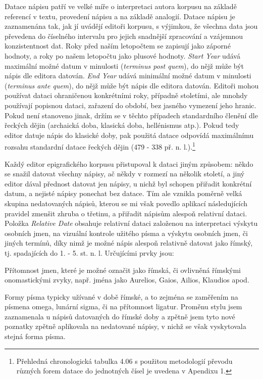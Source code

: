 Datace nápisu patří ve velké míře o interpretaci autora korpusu na základě referencí v textu, provedení nápisu a na základě analogií. Datace nápisu je zaznamenána tak, jak jí uvádějí editoři korpusu, s výjimkou, že všechna data jsou převedena do číselného intervalu pro jejich snadnější zpracování a vzájemnou konzistentnost dat. Roky před naším letopočtem se zapisují jako záporné hodnoty, a roky po našem letopočtu jako plusové hodnoty. {\em Start Year} udává maximální možné datum v minulosti ({\em terminus post quem}), do nějž může být nápis dle editora datován. {\em End Year} udává minimální možné datum v minulosti ({\em terminus ante quem}), do nějž může být nápis dle editora datován. Editoři mohou používat dataci ohraničenou konkrétními roky, případně stoletími, ale mnohdy používají popisnou dataci, zařazení do období, bez jasného vymezení jeho hranic. Pokud není stanoveno jinak, držím se v těchto případech standardního členění dle řeckých dějin (archaická doba, klasická doba, hellénismus atp.). Pokud tedy editor datuje nápis do klasické doby, pak použitá datace odpovídá maximálnímu rozsahu standardní datace řeckých dějin (479 - 338 př. n. l.).\footnote{Přehledná chronologická tabulka 4.06 s použitou metodologií převodu různých forem datace do jednotných čísel je uvedena v Apendixu 1.}

Každý editor epigrafického korpusu přistupoval k dataci jiným způsobem: někdo se snažil datovat všechny nápisy, ač někdy v rozmezí na několik století, a jiný editor dával přednost datovat jen nápisy, u nichž byl schopen přiřadit konkrétní datum, a nejisté nápisy ponechat bez datace. Tím ale vznikla poměrně velká skupina nedatovaných nápisů, kterou se mi však povedlo aplikací následujících pravidel zmenšit zhruba o třetinu, a přiřadit nápisům alespoň relativní dataci. Položka {\em Relative Date} obsahuje relativní dataci založenou na interpretaci výskytu osobních jmen, na vizuální kontrole užitého písma a výskytu osobních jmen, či jiných termínů, díky nimž je možné nápis alespoň relativně datovat jako římský, tj. spadajících do 1. - 5. st. n. l. Určujícími prvky jsou:

\startitemize
\item
  \startblockquote
  Přítomnost jmen, které je možné označit jako římská, či ovlivněná římskými onomastickými zvyky, např. jména jako Aurelios, Gaios, Ailios, Klaudios apod.
  \stopblockquote
\item
  \startblockquote
  Formy písma typicky užívané v době římské, a to zejména se zaměřením na písmena omega, lunární sigma, či na přítomnost ligatur. Proměnu stylu jsem zaznamenala u nápisů datovaných do římské doby a zpětně jsem tyto nové poznatky zpětně aplikovala na nedatované nápisy, v nichž se však vyskytovala stejná forma písma.
  \stopblockquote
\stopitemize

